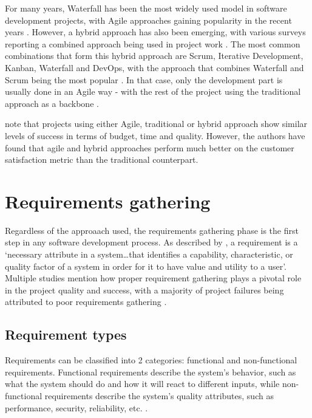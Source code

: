 For many years, Waterfall has been the most widely used model in software development projects, with Agile approaches gaining popularity in the recent years \parencite{hybrid1}. However, a hybrid approach has also been emerging, with various surveys reporting a combined approach being used in project work \parencite{hybrid1,hybrid2}. The most common combinations that form this hybrid approach are Scrum, Iterative Development, Kanban, Waterfall and DevOps, with the approach that combines Waterfall and Scrum being the most popular \parencite{hybrid2}. In that case, only the development part is usually done in an Agile way - with the rest of the project using the traditional approach as a backbone \parencite{hybrid2}.

\textcite{hybrid1} note that projects using either Agile, traditional or hybrid approach show similar levels of success in terms of budget, time and quality. However, the authors have found that agile and hybrid approaches perform much better on the customer satisfaction metric than the traditional counterpart.

\section{Requirements gathering}

Regardless of the approaach used, the requirements gathering phase is the first step in any software development process. As described by \textcite{reqanalysis2}, a requirement is a `necessary attribute in a system\ldots that identifies a capability, characteristic, or quality factor of a system in order for it to have value and utility to a user'. Multiple studies mention how proper requirement gathering plays a pivotal role in the project quality and success, with a majority of project failures being attributed to poor requirements gathering \parencite{reqanalysis1, reqanalysis3, reqanalysis5}.

\subsection{Requirement types}

Requirements can be classified into 2 categories: functional and non-functional requirements. Functional requirements describe the system's behavior, such as what the system should do and how it will react to different inputs, while non-functional requirements describe the system's quality attributes, such as performance, security, reliability, etc. \parencite[6]{requirements}.

